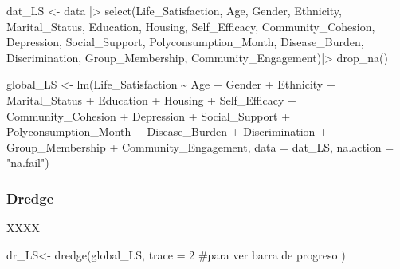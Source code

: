 \documentclass[
  bookmarksnumbered]{article}
\newenvironment{Shaded}{\begin{snugshade}}{\end{snugshade}}
\newcommand{\AttributeTok}[1]{\textcolor[rgb]{0.80,0.80,0.80}{#1}}
\newcommand{\CommentTok}[1]{\textcolor[rgb]{0.50,0.62,0.50}{#1}}
\newcommand{\DecValTok}[1]{\textcolor[rgb]{0.86,0.86,0.80}{#1}}
\newcommand{\FunctionTok}[1]{\textcolor[rgb]{0.94,0.94,0.56}{#1}}
\newcommand{\NormalTok}[1]{\textcolor[rgb]{0.80,0.80,0.80}{#1}}
\newcommand{\OtherTok}[1]{\textcolor[rgb]{0.94,0.94,0.56}{#1}}
\newcommand{\SpecialCharTok}[1]{\textcolor[rgb]{0.86,0.64,0.64}{#1}}
\newcommand{\StringTok}[1]{\textcolor[rgb]{0.80,0.58,0.58}{#1}}
\begin{document}
\begin{Shaded}
\begin{Highlighting}[]
\NormalTok{dat\_LS }\OtherTok{\textless{}{-}}\NormalTok{ data }\SpecialCharTok{|\textgreater{}} 
  \FunctionTok{select}\NormalTok{(Life\_Satisfaction, Age, Gender, Ethnicity, Marital\_Status, Education, Housing, }
\NormalTok{         Self\_Efficacy, Community\_Cohesion, Depression, Social\_Support, Polyconsumption\_Month,}
\NormalTok{         Disease\_Burden, Discrimination, Group\_Membership, Community\_Engagement)}\SpecialCharTok{|\textgreater{}} 
  \FunctionTok{drop\_na}\NormalTok{()}

\NormalTok{global\_LS }\OtherTok{\textless{}{-}} \FunctionTok{lm}\NormalTok{(Life\_Satisfaction }\SpecialCharTok{\textasciitilde{}}\NormalTok{ Age }\SpecialCharTok{+}\NormalTok{ Gender }\SpecialCharTok{+}\NormalTok{ Ethnicity }\SpecialCharTok{+}\NormalTok{ Marital\_Status }\SpecialCharTok{+}\NormalTok{ Education }\SpecialCharTok{+}
\NormalTok{                  Housing }\SpecialCharTok{+}\NormalTok{ Self\_Efficacy }\SpecialCharTok{+}\NormalTok{ Community\_Cohesion }\SpecialCharTok{+}\NormalTok{ Depression }\SpecialCharTok{+} 
\NormalTok{                  Social\_Support }\SpecialCharTok{+}\NormalTok{ Polyconsumption\_Month }\SpecialCharTok{+}\NormalTok{ Disease\_Burden }\SpecialCharTok{+}\NormalTok{ Discrimination }\SpecialCharTok{+}
\NormalTok{                  Group\_Membership }\SpecialCharTok{+}\NormalTok{ Community\_Engagement,}
                \AttributeTok{data =}\NormalTok{ dat\_LS,}
                \AttributeTok{na.action =} \StringTok{"na.fail"}\NormalTok{)}
\end{Highlighting}
\end{Shaded}

\subsubsection{Dredge}\label{dredge}

XXXX

\begin{Shaded}
\begin{Highlighting}[]
\NormalTok{dr\_LS}\OtherTok{\textless{}{-}} \FunctionTok{dredge}\NormalTok{(global\_LS, }
               \AttributeTok{trace =} \DecValTok{2} \CommentTok{\#para ver barra de progreso}
\NormalTok{)}
\end{Highlighting}
\end{Shaded}
\end{document}
